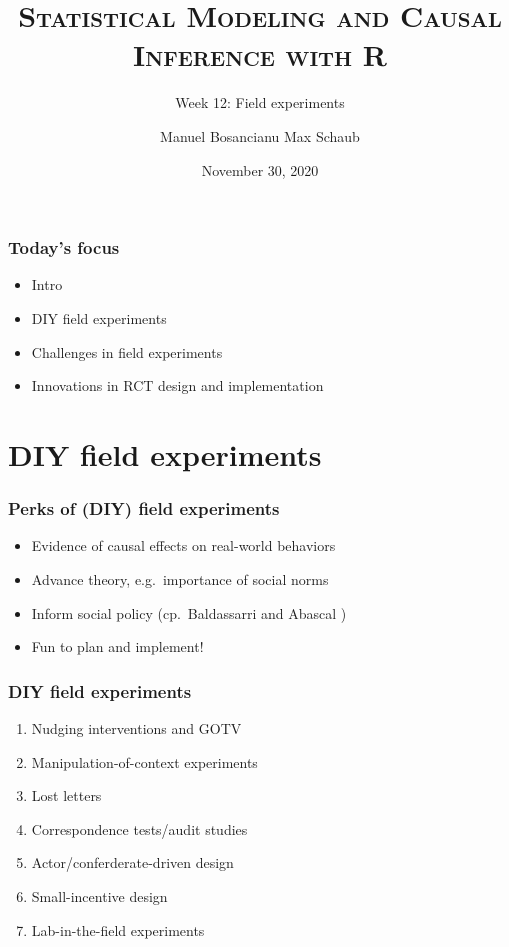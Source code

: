 \documentclass[12pt,english,dvipsnames,aspectratio=169,handout]{beamer}\usepackage[]{graphicx}\usepackage[]{xcolor}
\title{\textsc{Statistical Modeling and Causal Inference with R}}
\subtitle{Week 12: Field experiments}
\date{November 30, 2020}
\author{Manuel Bosancianu \hfill Max Schaub}
\institute{Hertie School of Governance}
\begin{document}
\maketitle

\begin{frame}
	\frametitle{Today's focus}
	\begin{itemize}
		\item Intro
		\item DIY field experiments
		\item Challenges in field experiments
		\item Innovations in RCT design and implementation
	\end{itemize}
\end{frame}

\section{DIY field experiments}

\begin{frame}
	\frametitle{Perks of (DIY) field experiments}
	\begin{itemize}
		\item Evidence of causal effects on real-world behaviors
		\item Advance theory, e.g.\ importance of social norms
		\item Inform social policy (cp.\ Baldassarri and Abascal \citeyear{baldassarri_field_2017})
		\item Fun to plan and implement!
	\end{itemize}
\vspace{3cm}
\end{frame}


\begin{frame}
	\frametitle{DIY field experiments}
	\begin{enumerate}
	  \item Nudging interventions and GOTV
		\item Manipulation-of-context experiments 
		\item Lost letters
		\item Correspondence tests/audit studies
		\item Actor/conferderate-driven design
		\item Small-incentive design
		\item Lab-in-the-field experiments
	\end{enumerate}
\end{frame}
\end{document}

